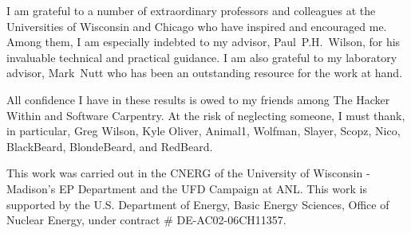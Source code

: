 I am grateful to a number of extraordinary professors and colleagues at the 
Universities of Wisconsin and Chicago who have inspired and encouraged me. Among  
them, I am especially indebted to my advisor, Paul~P.H.~Wilson, for his invaluable 
technical and practical guidance. I am also grateful to my laboratory advisor, 
Mark~Nutt who has been an outstanding resource for the work at hand.

All confidence I have in these results is owed to my friends among The Hacker 
Within and Software Carpentry. At the risk of neglecting someone, I must thank, 
in particular, Greg Wilson, Kyle Oliver, Animal1, Wolfman, Slayer, Scopz, Nico,  
BlackBeard, BlondeBeard, and RedBeard.

This work was carried out in the \gls{CNERG} of the University of Wisconsin - 
Madison's \gls{EP} Department and the \gls{UFD} Campaign at \gls{ANL}. This 
work is supported by the U.S. Department of Energy, Basic Energy Sciences, 
Office of Nuclear Energy, under contract \# DE-AC02-06CH11357.
